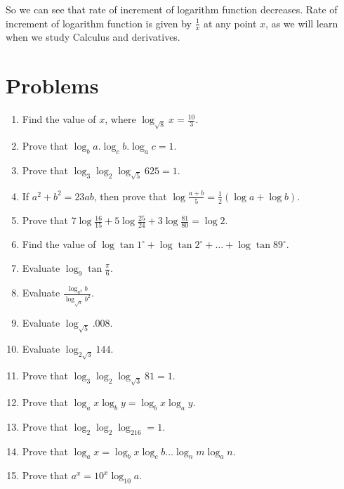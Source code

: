 So we can see that rate of increment of logarithm function decreases. Rate of increment of logarithm function is given by
$\frac{1}{x}$ at any point $x$, as we will learn when we study Calculus and derivatives.

\section{Problems}
\begin{enumerate}
\item Find the value of $x$, where $\log_{\sqrt{8}} x = \frac{10}{3}$.
\item Prove that $\log_ba.\log_cb.\log_ac = 1$.
\item Prove that $\log_3\log_2\log_{\sqrt{5}}625 = 1$.
\item If $a^2 + b^2 = 23ab$, then prove that $\log\frac{a + b}{5} = \frac{1}{2}(\log a + \log b)$.
\item Prove that $7\log\frac{16}{15} + 5\log\frac{25}{24} + 3\log\frac{81}{80} = \log 2$.
\item Find the value of $\log\tan1^\circ + \log\tan2^\circ + \ldots + \log\tan89^\circ$.
\item Evaluate $\log_9\tan\frac{\pi}{6}$.
\item Evaluate $\frac{\log_{a^2}b}{\log_{\sqrt{a}}b^2}$.
\item Evaluate $\log_{\sqrt{5}}.008$.
\item Evaluate $\log_{2\sqrt{3}}144$.
\item Prove that $\log_3\log_2\log_{\sqrt{3}}81 = 1$.
\item Prove that $\log_ax\log_by = \log_bx\log_ay$.
\item Prove that $\log_2\log_2\log_216 = 1$.
\item Prove that $\log_ax = \log_bx\log_cb\ldots\log_nm\log_an$.
\item Prove that $a^x = 10^x\log_{10}a$.
\end{enumerate}
